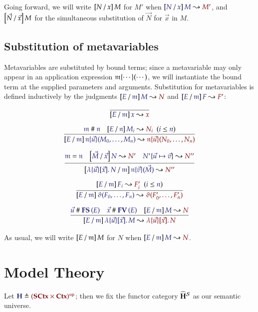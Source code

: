 \documentclass[11pt]{article}
\theoremstyle{definition}
\theoremstyle{remark}
\numberwithin{equation}{section}
\newcommand\HypCat{\mathbf{H}}
\begin{document}
Going forward, we will write $\left[N\, /\, x\right]M$ for $M'$ when
$\IsSubst{N}{x}{M}{M'}$, and $\left[\vec{N}\, /\, \vec{x}\right]M$ for the simultaneous
substitution of $\vec{N}$ for $\vec{x}$ in $M$.

\subsection{Substitution of metavariables}

Metavariables are substituted by bound terms; since a metavariable may only
appear in an application expression $\mathfrak{m}\{\cdots\}(\cdots)$, we will
instantiate the bound term at the supplied parameters and arguments.
Substitution for metavariables is defined inductively by the judgments
$\IsSubst{E}{\MV{m}}{M}{N}$ and $\IsSubst{E}{\MV{m}}{F}{F'}$:

\begin{gather*}
  \infer{
    \IsSubst{E}{\MV{m}}{x}{x}
  }{
  }
\\[6pt]
  \infer{
    \IsSubst{E}{\MV{m}}{
      \MApp{\MV{n}}{\vec{u}}{M_0,\dots,M_n}
    }{
      \MApp{\MV{n}}{\vec{u}}{N_0,\dots,N_n}
    }
  }{
    \IsApart{\MV{m}}{\MV{n}}
&
    \HypJ{
      \IsSubst{E}{\MV{n}}{M_i}{N_i}
    }{
      \Leq{i}{n}
    }
  }
\\[6pt]
  \infer{
    \IsSubst{
      \MkBTm{\vec{u}}{\vec{x}}{N}
    }{\MV{m}}{
      \MApp{\MV{n}}{\vec{v}}{\vec{M}}
    }{
      N''
    }
  }{
    \IsEq{\MV{m}}{\MV{n}}
&
    \IsSubst{\vec{M}}{\vec{x}}{N}{N'}
&
    \IsRenaming{\vec{u}\mapsto\vec{v}}{N'}{N''}
  }\\[6pt]
  \infer{
    \IsSubst{E}{\MV{m}}{
      \App{\vartheta}{F_0,\dots,F_n}
    }{
      \App{\vartheta}{F'_0,\dots,F'_n}
    }
  }{
    \HypJ{
      \IsSubst{E}{\MV{m}}{F_i}{F'_i}
    }{
      \Leq{i}{n}
    }
  }
\\[6pt]
  \infer{
    \IsSubst{E}{\MV{m}}{
      \MkBTm{\vec{u}}{\vec{x}}{M}
    }{
      \MkBTm{\vec{u}}{\vec{x}}{N}
    }
  }{
    \IsApart{\vec{u}}{\FS{E}}
&
    \IsApart{\vec{x}}{\FV{E}}
&
    \IsSubst{E}{\MV{m}}{M}{N}
  }
\end{gather*}

As usual, we will write $\left[E\, /\, \mathfrak{m}\right]M$ for $N$ when
$\IsSubst{E}{\MV{m}}{M}{N}$.

\section{Model Theory}

Let $\Define{\HypCat}{\OpCat{(\SCtx\times\Ctx)}}$; then we fix the functor
category $\widehat{\HypCat}^\Sorts$ as our semantic universe.
\end{document}
